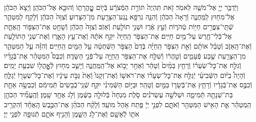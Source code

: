 \documentclass[twoside, openany, parskip=half, 11pt]{book}
\begin{document}
\begin{footnotesize}
\begin{multicols}{2}
\\
וַיְֿדַבֵּ֥ר יְיָ֖ אֶל־מֹשֶׁ֥ה לֵּאמֹֽר׃ זֹ֤את תִּֽהְיֶה֙ תּוֹרַ֣ת הַמְּֿצֹרָ֔ע בְּֿי֖וֹם טׇׇׇׇׇׇׇָֽהֳרָת֑וֹ וְֿהוּבָ֖א אֶל־הַכֹּהֵֽן׃ וְֿיָצָא֙ הַכֹּהֵ֔ן אֶל־מִח֖וּץ לַֽמַּֽחֲנֶ֑ה וְֿרָאָה֙ הַכֹּהֵ֔ן וְֿהִנֵּ֛ה נִרְפָּ֥א נֶֽגַע־הַצָּרַ֖עַת מִן־הַצָּרֽוּעַ׃ וְֿצִוָּה֙ הַכֹּהֵ֔ן וְֿלָקַ֧ח לַמִּטַּהֵ֛ר שְֿׁתֵּֽי־צִפֳּרִ֥ים חַיּ֖וֹת טְֿהֹר֑וֹת וְֿעֵ֣ץ אֶ֔רֶז וּשְׁנִ֥י תוֹלַ֖עַת וְֿאֵזֹֽב׃ וְֿצִוָּה֙ הַכֹּהֵ֔ן וְֿשָׁחַ֖ט אֶת־הַצִּפּ֣וֹר הָֽאֶחָ֑ת אֶל־כְּֿלִי־חֶ֖רֶשׂ עַל־מַ֥יִם חַיִּֽים׃  אֶת־הַצִּפֹּ֤ר הַֽחַיָּה֙ יִקַּ֣ח אֹתָ֔הּ וְֿאֶת־עֵ֥ץ הָאֶ֛רֶז וְֿאֶת־שְׁנִ֥י הַתּוֹלַ֖עַת וְֿאֶת־הָֽאֵזֹ֑ב וְֿטָבַ֨ל אוֹתָ֜ם וְֿאֵ֣ת הַצִּפֹּ֣ר הַֽחַיָּ֗ה בְּֿדַם֙ הַצִּפֹּ֣ר הַשְּֿׁחֻטָ֔ה עַ֖ל הַמַּ֥יִם הַֽחַיִּֽים׃ וְֿהִזָּ֗ה עַ֧ל הַמִּטַּהֵ֛ר מִן־הַצָּרַ֖עַת שֶׁ֣בַע פְּֿעָמִ֑ים וְֿטִ֣הֲר֔וֹ וְֿשִׁלַּ֛ח אֶת־הַצִּפֹּ֥ר הַֽחַיָּ֖ה עַל־פְּֿנֵ֥י הַשָּׂדֶֽה׃ וְֿכִבֶּס֩ הַמִּטַּהֵ֨ר אֶת־בְּֿגָדָ֜יו וְֿגִלַּ֣ח אֶת־כׇּל־שְׂעָר֗וֹ וְֿרָחַ֤ץ בַּמַּ֨יִם֙ וְֿטָהֵ֔ר וְֿאַחַ֖ר יָב֣וֹא אֶל־הַֽמַּֽחֲנֶ֑ה וְֿיָשַׁ֛ב מִח֥וּץ לְֿאׇׇׇׇׇָֽהֳל֖וֹ שִׁבְעַ֥ת יָמִֽים׃ וְֿהָיָה֩ בַיּ֨וֹם הַשְּֿׁבִיעִ֜י יְֿגַלַּ֣ח אֶת־כׇּל־שְׂעָר֗וֹ אֶת־רֹאשׁ֤וֹ וְֿאֶת־זְקָנוֹ֙ וְֿאֵת֙ גַּבֹּ֣ת עֵינָ֔יו וְֿאֶת־כׇּל־שְׂעָר֖וֹ יְֿגַלֵּ֑חַ וְֿכִבֶּ֣ס אֶת־בְּֿגָדָ֗יו וְֿרָחַ֧ץ אֶת־בְּֿשָׂר֛וֹ בַּמַּ֖יִם וְֿטָהֵֽר׃  וּבַיּ֣וֹם הַשְּֿׁמִינִ֗י יִקַּ֤ח שְֿׁנֵֽי־כְֿבָשִׂים֙ תְּֿמִימִ֔ם וְֿכַבְשָׂ֥ה אַחַ֛ת בַּת־שְׁנָתָ֖הּ תְּֿמִימָ֑ה וּשְׁלשָׁ֣ה עֶשְׂרֹנִ֗ים סֹ֤לֶת מִנְחָה֙ בְּֿלוּלָ֣ה בַשֶּׁ֔מֶן וְֿלֹ֥ג אֶחָ֖ד שָֽׁמֶן׃ וְֿהֶֽעֱמִ֞יד הַכֹּהֵ֣ן הַֽמְטַהֵ֗ר אֵ֛ת הָאִ֥ישׁ הַמִּטַּהֵ֖ר וְֿאֹתָ֑ם לִפְנֵ֣י יְיָ֔ פֶּ֖תַח אֹ֥הֶל מוֹעֵֽד׃ וְֿלָקַ֨ח הַכֹּהֵ֜ן אֶת־הַכֶּ֣בֶשׂ הָֽאֶחָ֗ד וְֿהִקְרִ֥יב אֹת֛וֹ לְֿאָשָׁ֖ם וְֿאֶת־לֹ֣ג הַשָּׁ֑מֶן וְֿהֵנִ֥יף אֹתָ֛ם תְּֿנוּפָ֖ה לִפְנֵ֥י יְיָ׃


\end{multicols}
\end{footnotesize}
\end{document}
